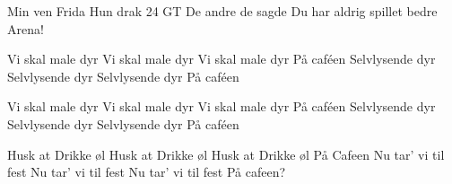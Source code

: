 \documentclass[a4paper,11pt]{article}
\begin{document}
\begin{song}
 Min ven Frida
Hun drak 24 GT
De andre de sagde
Du har aldrig spillet bedre Arena!




Vi skal male dyr
Vi skal male dyr
Vi skal male dyr
På caféen
Selvlysende dyr
Selvlysende dyr
Selvlysende dyr
På caféen




Vi skal male dyr
Vi skal male dyr
Vi skal male dyr
På caféen
Selvlysende dyr
Selvlysende dyr
Selvlysende dyr
På caféen


Husk at Drikke øl
Husk at Drikke øl
Husk at Drikke øl
På Cafeen
Nu tar' vi til fest
Nu tar' vi til fest
Nu tar' vi til fest
På cafeen?

\end{song}
\end{document}

